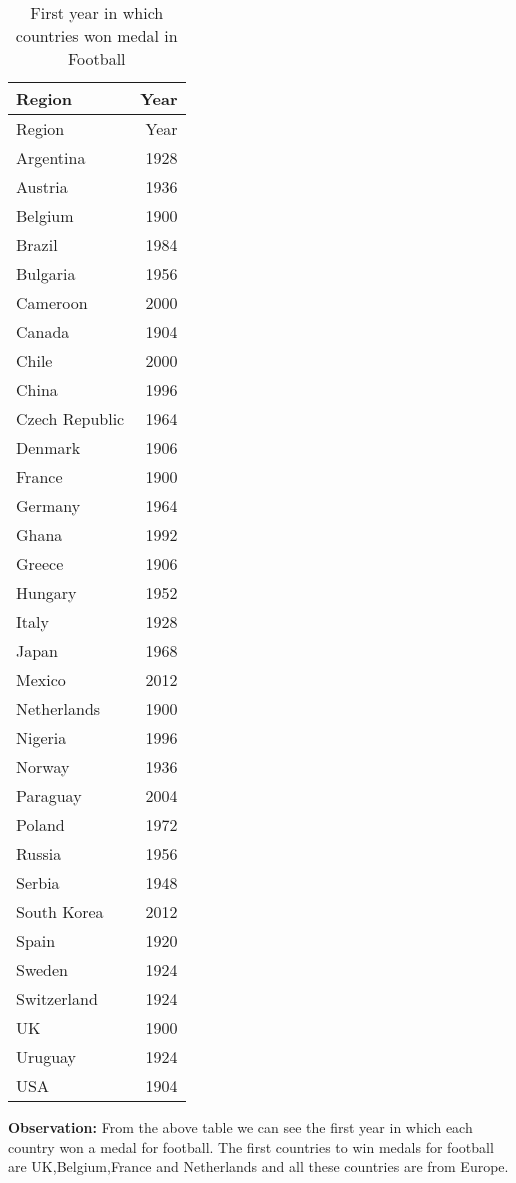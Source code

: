 \documentclass[
]{article}
\begin{document}
\begin{longtable}[]{@{}lr@{}}
\caption{First year in which countries won medal in
Football}\tabularnewline
\toprule
Region & Year \\
\midrule
\endfirsthead
\toprule
Region & Year \\
\midrule
\endhead
Argentina & 1928 \\
Austria & 1936 \\
Belgium & 1900 \\
Brazil & 1984 \\
Bulgaria & 1956 \\
Cameroon & 2000 \\
Canada & 1904 \\
Chile & 2000 \\
China & 1996 \\
Czech Republic & 1964 \\
Denmark & 1906 \\
France & 1900 \\
Germany & 1964 \\
Ghana & 1992 \\
Greece & 1906 \\
Hungary & 1952 \\
Italy & 1928 \\
Japan & 1968 \\
Mexico & 2012 \\
Netherlands & 1900 \\
Nigeria & 1996 \\
Norway & 1936 \\
Paraguay & 2004 \\
Poland & 1972 \\
Russia & 1956 \\
Serbia & 1948 \\
South Korea & 2012 \\
Spain & 1920 \\
Sweden & 1924 \\
Switzerland & 1924 \\
UK & 1900 \\
Uruguay & 1924 \\
USA & 1904 \\
\bottomrule
\end{longtable}

\textbf{Observation:} From the above table we can see the first year in
which each country won a medal for football. The first countries to win
medals for football are UK,Belgium,France and Netherlands and all these
countries are from Europe.
\end{document}
